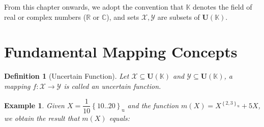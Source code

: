 \documentclass[a4paper,12pt,twoside]{memoir}
\newtheorem{definition}{Definition}[chapter]
\newtheorem{example}{Example}[chapter]
\newcommand{\set}[1]{\left\{#1\right\}} %
\newcommand{\s}[1]{\set{#1}_\mathrm{u}} %
\newcommand{\tsbd}[1]{\mathbf{U}(\mathbb{#1})}
\begin{document}
	From this chapter onwards, we adopt the convention that $\mathbb{K}$ denotes the field of real or complex numbers ($\mathbb{R}$ or $\mathbb{C}$), and sets $\mathcal{X}, \mathcal{Y}$ are subsets of $\tsbd{K}$.
	
	\section{Fundamental Mapping Concepts}
	\begin{definition}[Uncertain Function]
		Let $\mathcal{X} \subseteq \tsbd{K}$ and $\mathcal{Y} \subseteq \tsbd{K}$, a mapping $f: \mathcal{X} \to \mathcal{Y}$ is called an uncertain function.
	\end{definition}
	
	\begin{example}
		Given $X = \dfrac{1}{10}\s{10..20}$ and the function $m(X) = X^{\s{2,3}}+5X$, we obtain the result that $m(X)$ equals:
		

\end{example}
\end{document}
